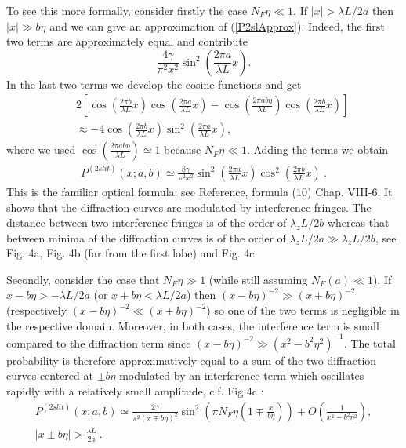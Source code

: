 \documentclass[12pt,aps,prb,preprint]{revtex4-1}   %
\begin{document}
To see this more formally, consider firstly the case
$N_F\eta\ll1$. If $|x|>\lambda L/2a$ then $|x|\gg b\eta$ and we
can give an approximation of (\ref{P2slApprox}). Indeed, the first
two terms are approximately equal and contribute $$
\frac{4\gamma}{\pi^2 x^2} \sin^2 ( \frac{2 \pi a}{\lambda L} x).
$$  In the last two terms we develop the cosine functions and get
\begin{eqnarray*}
&& 2 \left[\cos{(\frac{2\pi b}{\lambda L}x)}\cos{(\frac{2\pi
a}{\lambda L}x)}-\cos{(\frac{2\pi ab\eta}{\lambda
L})}\cos{(\frac{2\pi b}{\lambda L}x)} \right] \\ && \approx -4
\cos (\frac{2 \pi b}{\lambda L} x) \sin^2 (\frac{2 \pi a}{\lambda
L} x),
\end{eqnarray*}
where we used $\cos{(\frac{2\pi ab\eta}{\lambda L})}\simeq1$
because $N_F\eta\ll1$. Adding the terms we obtain
\begin{eqnarray}\label{P2slApprox2}
P^{(2slit)}(x;a,b) \simeq \frac{8\gamma}{\pi^2
x^2}\sin^2{(\frac{2\pi a}{\lambda L}x)} \cos^2{(\frac{2\pi
b}{\lambda L}x)}\ .
\end{eqnarray}
This is the familiar optical formula: see Reference,\cite{Optics} formula
(10) Chap. VIII-6. It shows that the diffraction curves are modulated by
interference fringes. The distance between two interference
fringes is of the order of $\lambda_z L/2b$ whereas that between
minima of the diffraction curves is of the order of $\lambda_z
L/2a \gg \lambda_z L/2b$, see Fig. 4a, Fig. 4b (far from the first
lobe) and Fig. 4c.

Secondly, consider the case that $N_F\eta\gg1$ (while still
assuming $N_F(a)\ll 1$). If $x-b\eta>-\lambda L/2a$ (or
$x+b\eta<\lambda L/2a$) then $(x-b\eta)^{-2}\gg (x+b\eta)^{-2}$
(respectively $(x-b\eta)^{-2}\ll (x+b\eta)^{-2}$) so one of the
two terms is negligible in the respective domain. Moreover, in
both cases, the interference term is small compared to the
diffraction term since $(x-b\eta)^{-2}\gg (x^2-b^2\eta^2)^{-1}$.
The total probability is therefore approximatively equal to a sum
of the two diffraction curves centered at $\pm b\eta$ modulated by
an interference term which oscillates rapidly with a relatively
small amplitude, c.f. Fig 4c :
\begin{multline} \label{P2slApprox3}
P^{(2 slit)}(x;a,b) \simeq  \frac{2\gamma}{\pi^2 (x\mp b\eta)^2}
\sin^2 \left(\pi N_F \eta (1\mp\frac{x}{b\eta}) \right)  +
O(\frac{1}{x^2-b^2\eta^2}), \\ |x\pm b\eta| > \frac{\lambda L}{2a}\
.
\end{multline}
\end{document}
